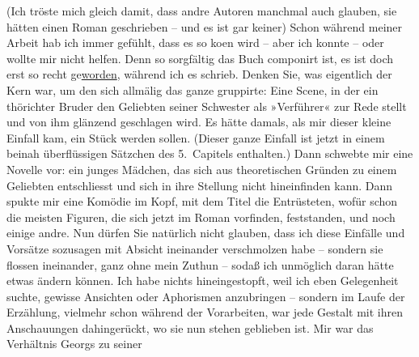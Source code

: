 \begin{ledgroupsized}[t]{13cm}
                    (Ich tröste mich gleich damit, dass andre Autoren manchmal auch glauben, sie
                    hätten einen Roman geschrieben – und es ist gar keiner) Schon während meiner
                    Arbeit hab ich immer gefühlt, dass es so ko{\geminationm}en wird
                    – aber ich konnte – oder wollte mir nicht helfen. Denn so sorgfältig das Buch
                    componirt ist, es ist doch erst so recht ge{\pb}\uline{worden}, während ich es schrieb. Denken Sie, was
                    eigentlich der Kern war, um den sich allmälig das ganze gruppirte: Eine Scene,
                    in der ein thörichter Bruder den Geliebten seiner Schwester als »Verführer« zur
                    Rede stellt und von ihm glänzend geschlagen wird. Es hätte damals, als mir
                    dieser kleine Einfall kam, ein Stück werden sollen. (Dieser ganze Einfall ist
                    jetzt in einem beinah überflüssigen Sätzchen des 5. Capitels enthalten.) Dann
                    schwebte mir eine Novelle vor: ein junges Mädchen, das sich aus theoretischen
                    Gründen zu einem Geliebten entschliesst und sich in ihre Stellung nicht
                    hineinfinden kann. Dann spukte mir eine Komödie im Kopf, mit dem Titel {\pb}die Entrüsteten, wofür schon die meisten Figuren, die
                    sich jetzt im Roman vorfinden, feststanden, und noch einige andre. Nun dürfen
                    Sie natürlich nicht glauben, dass ich diese Einfälle und Vorsätze sozusagen mit
                    Absicht ineinander verschmolzen habe – sondern sie flossen ineinander, ganz ohne
                    mein Zuthun – sodaß ich unmöglich daran hätte etwas ändern können. Ich habe
                    nichts hineingestopft, weil ich eben Gelegenheit suchte, gewisse Ansichten oder
                    Aphorismen anzubringen – sondern im Laufe der Erzählung, vielmehr schon während
                    der Vorarbeiten, war jede Gestalt mit ihren Anschauungen dahingerückt, wo sie
                    nun stehen geblieben ist. Mir war {\pb}das
                    Verhältnis Georgs zu seiner

\end{ledgroupsized}
